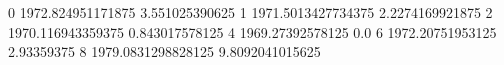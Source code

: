 0 1972.824951171875 3.551025390625
1 1971.5013427734375 2.2274169921875
2 1970.116943359375 0.843017578125
4 1969.27392578125 0.0
6 1972.20751953125 2.93359375
8 1979.0831298828125 9.8092041015625
